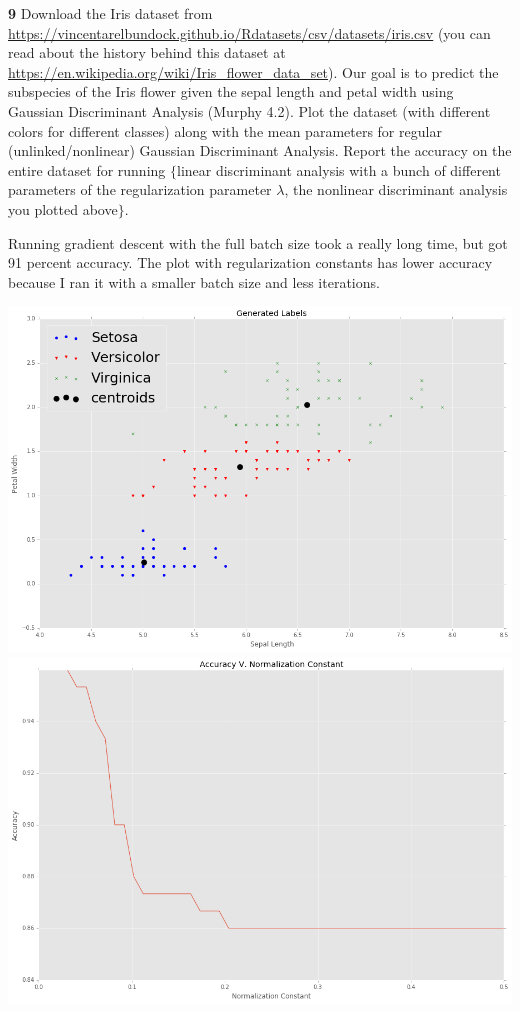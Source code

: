 \documentclass[12pt,letterpaper,fleqn]{hmcpset}
\begin{document}
\newpage


\textbf{9} Download the Iris dataset from \url{https://vincentarelbundock.github.io/Rdatasets/csv/datasets/iris.csv}
(you can read about the history behind this dataset at \url{https://en.wikipedia.org/wiki/Iris_flower_data_set}).
Our goal is to predict the subspecies of the Iris flower given the sepal length and petal
width using Gaussian Discriminant Analysis (Murphy 4.2). Plot the dataset (with different
colors for different classes) along with the mean parameters for regular (unlinked/nonlinear)
Gaussian Discriminant Analysis. Report the accuracy on the entire dataset for running
$\{$linear discriminant analysis with a bunch of different parameters of the regularization
parameter $\lambda$, the nonlinear discriminant analysis you plotted above$\}$. 

\vspace{15mm}

Running gradient descent with the full batch size took a really long time, but got 91 percent accuracy. The plot with regularization constants has lower accuracy because I ran it with a smaller batch size and less iterations.   
    
    \includegraphics[scale = .5]{GDAgenlabels.png}\\
    \includegraphics[scale = .5]{gdaconst.png}\\
\end{document}

